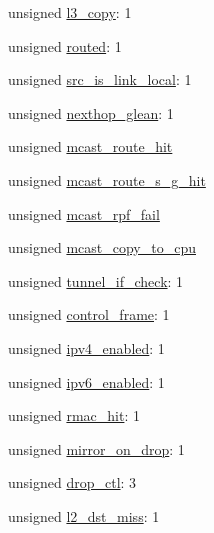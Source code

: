 \begin{DoxyCompactItemize}
\item 
unsigned \hyperlink{unionswitch__acl__system__value___a883aecbd6484fd89866ad27a08c0cf49}{l3\+\_\+copy}\+: 1
\item 
unsigned \hyperlink{unionswitch__acl__system__value___ad9d0a5d44108dabd8a453a20d244dbc3}{routed}\+: 1
\item 
unsigned \hyperlink{unionswitch__acl__system__value___a0c3610d61d7a4f1c9aeb784b7939286c}{src\+\_\+is\+\_\+link\+\_\+local}\+: 1
\item 
unsigned \hyperlink{unionswitch__acl__system__value___a91e620597c4b72cc2048727f8d5815c5}{nexthop\+\_\+glean}\+: 1
\item 
unsigned \hyperlink{unionswitch__acl__system__value___a02e6ccae2d0ca28135f4a2b3b65f69ff}{mcast\+\_\+route\+\_\+hit}
\item 
unsigned \hyperlink{unionswitch__acl__system__value___a3386f54d90cc9cea58e8418f7dd511df}{mcast\+\_\+route\+\_\+s\+\_\+g\+\_\+hit}
\item 
unsigned \hyperlink{unionswitch__acl__system__value___ac1e1221e3fe74fffe8829598d253c59e}{mcast\+\_\+rpf\+\_\+fail}
\item 
unsigned \hyperlink{unionswitch__acl__system__value___a7edf2b2836a55d96b3205a00e3d5968d}{mcast\+\_\+copy\+\_\+to\+\_\+cpu}
\item 
unsigned \hyperlink{unionswitch__acl__system__value___a034e5bc61ec4fb302706b383cfc5804c}{tunnel\+\_\+if\+\_\+check}\+: 1
\item 
unsigned \hyperlink{unionswitch__acl__system__value___a286860cc03653d754b4f0241f6971554}{control\+\_\+frame}\+: 1
\item 
unsigned \hyperlink{unionswitch__acl__system__value___a758e364b7718ab08d1e821a53a16af36}{ipv4\+\_\+enabled}\+: 1
\item 
unsigned \hyperlink{unionswitch__acl__system__value___ab8722757c5fb12ada4bcdc1d0056a290}{ipv6\+\_\+enabled}\+: 1
\item 
unsigned \hyperlink{unionswitch__acl__system__value___a8c4e8476703c56658d6ef54753ff663b}{rmac\+\_\+hit}\+: 1
\item 
unsigned \hyperlink{unionswitch__acl__system__value___a41f506937bebbecd9eada8aed4c02151}{mirror\+\_\+on\+\_\+drop}\+: 1
\item 
unsigned \hyperlink{unionswitch__acl__system__value___a9b23a24b82833ae476dd3ef6c46c828d}{drop\+\_\+ctl}\+: 3
\item 
unsigned \hyperlink{unionswitch__acl__system__value___a8c51c5b6e45ee072c874579790993abb}{l2\+\_\+dst\+\_\+miss}\+: 1

\end{DoxyCompactItemize}
